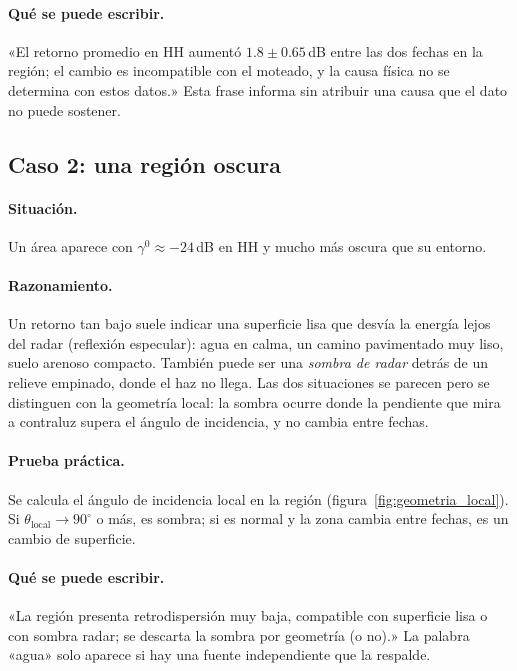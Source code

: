 \documentclass[11pt,a4paper]{article}
\begin{document}
\paragraph{Qué se puede escribir.} «El retorno promedio en HH aumentó $1.8\pm0.65$\,dB entre las dos fechas en
la región; el cambio es incompatible con el moteado, y la causa física no se determina con estos datos.» Esta
frase informa sin atribuir una causa que el dato no puede sostener.

\subsection{Caso 2: una región oscura}

\paragraph{Situación.} Un área aparece con $\gamma^0\approx-24$\,dB en HH y mucho más oscura que su entorno.

\paragraph{Razonamiento.} Un retorno tan bajo suele indicar una superficie lisa que desvía la energía lejos
del radar (reflexión especular): agua en calma, un camino pavimentado muy liso, suelo arenoso compacto. También
puede ser una \emph{sombra de radar} detrás de un relieve empinado, donde el haz no llega. Las dos situaciones
se parecen pero se distinguen con la geometría local: la sombra ocurre donde la pendiente que mira
a contraluz supera el ángulo de incidencia, y no cambia entre fechas.

\paragraph{Prueba práctica.} Se calcula el ángulo de incidencia local en la región (figura~\ref{fig:geometria_local}).
Si $\theta_{\text{local}}\to90^\circ$ o más, es sombra; si es normal y la zona cambia entre fechas, es un
cambio de superficie.

\paragraph{Qué se puede escribir.} «La región presenta retrodispersión muy baja, compatible con superficie
lisa o con sombra radar; se descarta la sombra por geometría (o no).» La palabra «agua» solo aparece si hay una fuente
independiente que la respalde.
\end{document}
